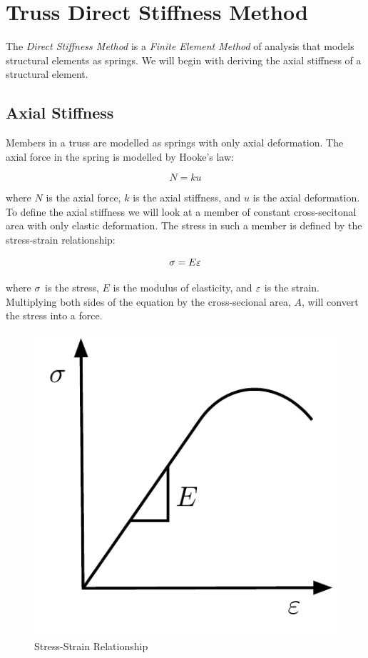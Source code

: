 \section{Truss Direct Stiffness Method}



The \textit{Direct Stiffness Method} is a \textit{Finite Element Method} of analysis that models structural elements as springs. We will begin with deriving the axial stiffness of a structural element. \cite{Felippa2000}

\subsection{Axial Stiffness}
Members in a truss are modelled as springs with only axial deformation. The axial force in the spring is modelled by Hooke's law:

\begin{equation}
	N = k u
\end{equation}

where $N$ is the axial force, $k$ is the axial stiffness, and $u$ is the axial deformation. To define the axial stiffness we will look at a member of constant cross-secitonal area with only elastic deformation. The stress in such a member is defined by the stress-strain relationship:

\begin{equation}
	\sigma = E \varepsilon
\end{equation}

where $\sigma$ is the stress, $E$ is the modulus of elasticity, and $\varepsilon$ is the strain. Multiplying both sides of the equation by the cross-secional area, $A$, will convert the stress into a force.

\begin{figure}[h]	\centerline{\includegraphics[width=0.5\columnwidth]{Figures/Stress-Strain}}
	\caption{Stress-Strain Relationship}
	\label{fig:Stress-Strain}
\end{figure}

